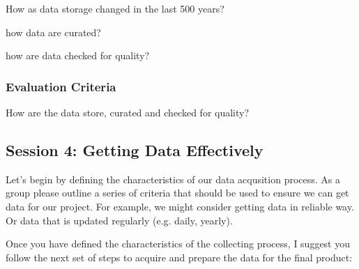 \documentclass{article}\usepackage[]{graphicx}\usepackage[]{color}
\newenvironment{enumerate*}%
  {\begin{enumerate}%
    \setlength{\itemsep}{0pt}%
    \setlength{\parskip}{0pt}}%
  {\end{enumerate}}
\begin{document}
\begin{enumerate*}
  \item How as data storage changed in the last 500 years?
  \item how data are curated? 
  \item how are data checked for quality?
\end{enumerate*}

\subsubsection{Evaluation Criteria}

How are the data store, curated and checked for quality?

\subsection{Session 4: Getting Data Effectively}

Let's begin by defining the characteristics of our data acqusition process. As a group please outline a series of criteria that should be used to ensure we can get data for our project. For example, we might consider getting data in reliable way. Or data that is updated regularly (e.g. daily, yearly).

Once you have defined the characteristics of the collecting process, I suggest you follow the next set of steps to acquire and prepare the data for the final product:
\end{document}
